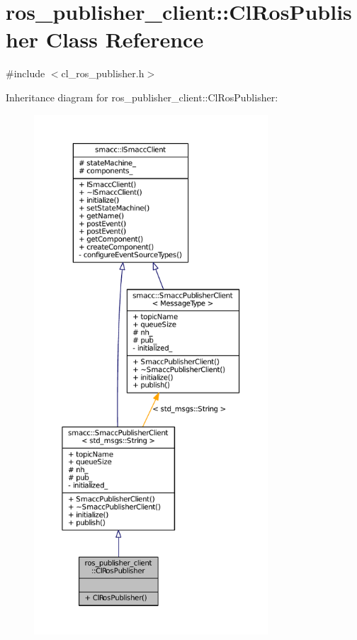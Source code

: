 \hypertarget{classros__publisher__client_1_1ClRosPublisher}{}\section{ros\+\_\+publisher\+\_\+client\+:\+:Cl\+Ros\+Publisher Class Reference}
\label{classros__publisher__client_1_1ClRosPublisher}


{\ttfamily \#include $<$cl\+\_\+ros\+\_\+publisher.\+h$>$}



Inheritance diagram for ros\+\_\+publisher\+\_\+client\+:\+:Cl\+Ros\+Publisher\+:
\nopagebreak
\begin{figure}[H]
\begin{center}
\leavevmode
\includegraphics[height=550pt]{classros__publisher__client_1_1ClRosPublisher__inherit__graph}
\end{center}
\end{figure}


